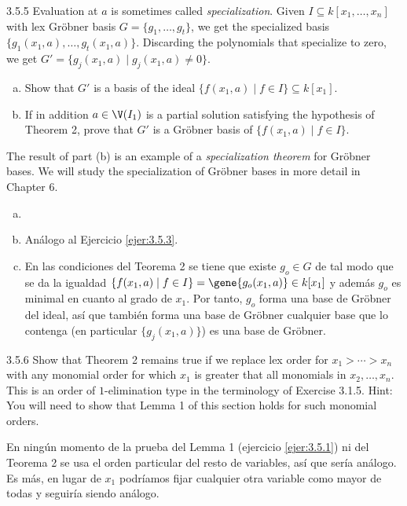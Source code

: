 \documentclass[twoside]{article}
\begin{document}
\begin{ejercicio}{3.5.5}
Evaluation at $a$ is sometimes called \emph{specialization}.
Given $I \subseteq k[x_1,\dots,x_n]$ with lex Gröbner basis $G = \{g_1,\dots,g_t\}$, we get the specialized basis $\{g_1(x_1,a),\dots,g_t(x_1,a)\}$.
Discarding the polynomials that specialize to zero, we get $G' = \{g_j(x_1,a) \mid g_j(x_1,a) \neq 0\}$.
\begin{enumerate}[a.]
\item Show that $G'$ is a basis of the ideal $\{f(x_1,a) \mid f \in I\} \subseteq k[x_1]$.
\item If in addition $a \in \V(I_1)$ is a partial solution satisfying the hypothesis of Theorem 2, prove that $G'$ is a Gröbner basis of $\{f(x_1,a) \mid f \in I\}$.
\end{enumerate}
The result of part (b) is an example of a \emph{specialization theorem} for Gröbner bases.
We will study the specialization of Gröbner bases in more detail in Chapter 6.
\end{ejercicio}
\begin{solucion}
\begin{enumerate}[a.]
\item[]
\item Análogo al Ejercicio \ref{ejer:3.5.3}.
\item En las condiciones del Teorema 2 se tiene que existe $g_o\in G$ de tal modo que se da la igualdad $\{f(x_1,a) \mid f \in I\}=\gene{g_o(x_1,a)}\in k[x_1]$ y además $g_o$ es minimal en cuanto al grado de $x_1$. Por tanto, $g_o$ forma una base de Gröbner del ideal, así que también forma una base de Gröbner cualquier base que lo contenga (en particular $\{g_j(x_1,a)\}$) es una base de Gröbner.
\end{enumerate}
\end{solucion}
\newpage

\begin{ejercicio}{3.5.6}
Show that Theorem 2 remains true if we replace lex order for $x_1 > \cdots > x_n$ with any monomial order for which $x_1$ is greater that all monomials in $x_2,\dots,x_n$.
This is an order of $1$-elimination type in the terminology of Exercise 3.1.5.
Hint: You will need to show that Lemma 1 of this section holds for such monomial orders.
\end{ejercicio}
\begin{solucion}
En ningún momento de la prueba del Lemma 1 (ejercicio \ref{ejer:3.5.1}) ni del Teorema 2 se usa el orden particular del resto de variables, así que sería análogo. Es más, en lugar de $x_1$ podríamos fijar cualquier otra variable como mayor de todas y seguiría siendo análogo.
\end{solucion}
\newpage
\end{document}
